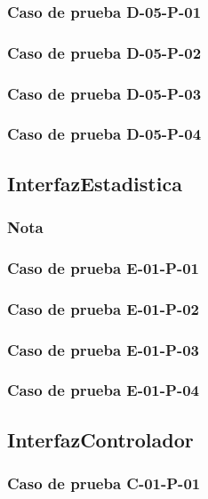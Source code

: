 \documentclass[10pt,a4paper]{article}
\begin{document}
			\subsubsection{Caso de prueba D-05-P-01}

			\subsubsection{Caso de prueba D-05-P-02}

			\subsubsection{Caso de prueba D-05-P-03}

			\subsubsection{Caso de prueba D-05-P-04}

	\subsection{InterfazEstadistica}
			\subsubsection{Nota}

			\subsubsection{Caso de prueba E-01-P-01}

			\subsubsection{Caso de prueba E-01-P-02}

			\subsubsection{Caso de prueba E-01-P-03}

			\subsubsection{Caso de prueba E-01-P-04}

	\subsection{InterfazControlador}
			\subsubsection{Caso de prueba C-01-P-01}
\end{document}

